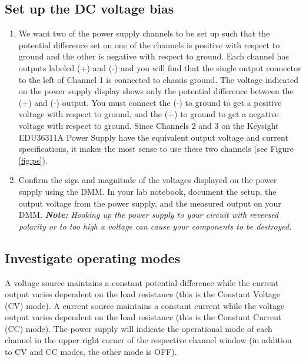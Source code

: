 \documentclass[10pt]{PhysLab1C} %
\begin{document}
\subsection{Set up the DC voltage bias}

\begin{enumerate}
\item
  We want two of the power supply channels to be set up such that the
  potential difference set on one of the channels is positive with
  respect to ground and the other is negative with respect to ground.
  Each channel has outputs labeled (+) and (-) and you will find that
  the single output connector to the left of Channel 1 is connected to
  chassis ground. The voltage indicated on the power supply display
  shows only the potential difference between the (+) and (-) output.
  You must connect the (-) to ground to get a positive voltage with
  respect to ground, and the (+) to ground to get a negative voltage
  with respect to ground. Since Channels 2 and 3 on the Keysight
  EDU36311A Power Supply have the equivalent output voltage and current
  specifications, it makes the most sense to use these two channels (see
  Figure \ref{fig:ps}).
\item
  Confirm the sign and magnitude of the voltages displayed on the power
  supply using the DMM. In your lab notebook, document the setup, the
  output voltage from the power supply, and the measured output on your
  DMM. \emph{\textbf{Note:} Hooking up the power supply to your circuit
  with reversed polarity or to too high a voltage can cause your
  components to be destroyed.}
\end{enumerate}

\subsection{Investigate operating modes}

A voltage source maintains a constant potential difference while the
current output varies dependent on the load resistance (this is the
Constant Voltage (CV) mode). A current source maintains a constant
current while the voltage output varies dependent on the load resistance
(this is the Constant Current (CC) mode). The power supply will indicate
the operational mode of each channel in the upper right corner of the
respective channel window (in addition to CV and CC modes, the other
mode is OFF).
\end{document}
